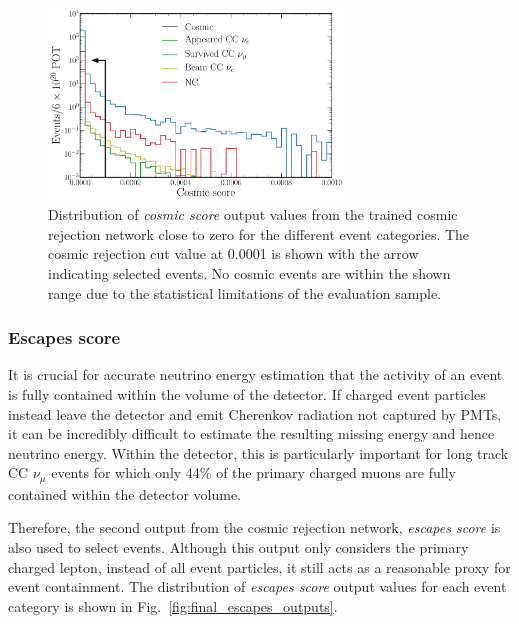 \begin{figure} %
    \includegraphics[width=0.7\textwidth]{diagrams/7-results/final_cosmic_zoomed_outputs.pdf}
    \caption[Distribution of cosmic score output values close to zero]
    {Distribution of \emph{cosmic score} output values from the trained cosmic rejection network
        close to zero for the different event categories. The cosmic rejection cut value at 0.0001
        is shown with the arrow indicating selected events. No cosmic events are within the shown
        range due to the statistical limitations of the evaluation sample.}
    \label{fig:cosmic_zoomed_outputs}
\end{figure}

\subsubsection*{Escapes score} %

It is crucial for accurate neutrino energy estimation that the activity of an event is fully
contained within the volume of the detector. If charged event particles instead leave the detector
and emit Cherenkov radiation not captured by PMTs, it can be incredibly difficult to estimate the
resulting missing energy and hence neutrino energy. Within the \chipsfive detector, this is
particularly important for long track CC $\nu_{\mu}$ events for which only 44\% of the primary
charged muons are fully contained within the detector volume.

Therefore, the second output from the cosmic rejection network, \emph{escapes score} is also used
to select events. Although this output only considers the primary charged lepton, instead of all
event particles, it still acts as a reasonable proxy for event containment. The distribution of
\emph{escapes score} output values for each event category is shown in
Fig.~\ref{fig:final_escapes_outputs}.

